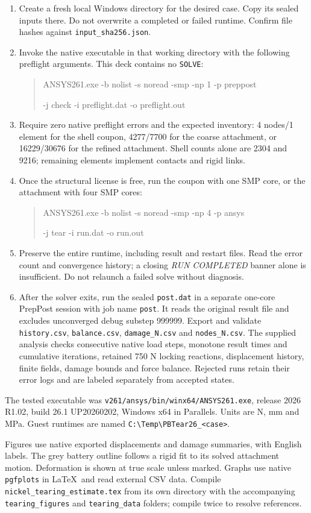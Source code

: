 \documentclass[10pt,a4paper]{article}
\newcommand{\ReportHeading}[1]{\par\vspace{6pt}{\large\bfseries\color{Teal}#1}\par\vspace{3pt}}
\begin{document}
\ReportHeading{Run in ANSYS 2026 R1}
\begin{enumerate}
\item Create a fresh local Windows directory for the desired case. Copy its sealed inputs there. Do not overwrite a completed or failed runtime. Confirm file hashes against \texttt{input\_sha256.json}.
\item Invoke the native executable in that working directory with the following preflight arguments. This deck contains no \texttt{SOLVE}:
\begin{quote}\small\ttfamily
ANSYS261.exe -b nolist -s noread -smp -np 1 -p preppost\par
-j check -i preflight.dat -o preflight.out
\end{quote}
\item Require zero native preflight errors and the expected inventory: 4 nodes/1 element for the shell coupon, 4277/7700 for the coarse attachment, or 16229/30676 for the refined attachment. Shell counts alone are 2304 and 9216; remaining elements implement contacts and rigid links.
\item Once the structural license is free, run the coupon with one SMP core, or the attachment with four SMP cores:
\begin{quote}\small\ttfamily
ANSYS261.exe -b nolist -s noread -smp -np 4 -p ansys\par
-j tear -i run.dat -o run.out
\end{quote}
\item Preserve the entire runtime, including result and restart files. Read the error count and convergence history; a closing \emph{RUN COMPLETED} banner alone is insufficient. Do not relaunch a failed solve without diagnosis.
\item After the solver exits, run the sealed \texttt{post.dat} in a separate one-core PrepPost session with job name \texttt{post}. It reads the original result file and excludes unconverged debug substep 999999. Export and validate \texttt{history.csv}, \texttt{balance.csv}, \texttt{damage\_N.csv} and \texttt{nodes\_N.csv}. The supplied analysis checks consecutive native load steps, monotone result times and cumulative iterations, retained 750 N locking reactions, displacement history, finite fields, damage bounds and force balance. Rejected runs retain their error logs and are labeled separately from accepted states.
\end{enumerate}
The tested executable was \texttt{v261/ansys/bin/winx64/ANSYS261.exe}, release 2026 R1.02, build 26.1 UP20260202, Windows x64 in Parallels. Units are N, mm and MPa. Guest runtimes are named \texttt{C:\textbackslash Temp\textbackslash PBTear26\_<case>}.

\ReportHeading{Figures and report}
Figures use native exported displacements and damage summaries, with English labels. The grey battery outline follows a rigid fit to its solved attachment motion. Deformation is shown at true scale unless marked. Graphs use native \texttt{pgfplots} in \LaTeX\ and read external CSV data. Compile \texttt{nickel\_tearing\_estimate.tex} from its own directory with the accompanying \texttt{tearing\_figures} and \texttt{tearing\_data} folders; compile twice to resolve references.
\end{document}

